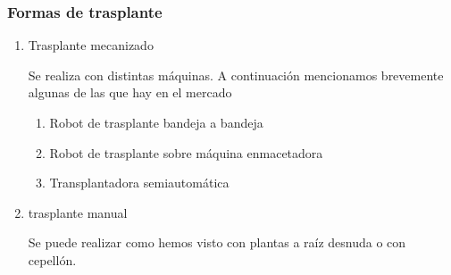 \documentclass[a4paper,12pt,oneside]{article}
\begin{document}
\subsubsection{Formas de trasplante}
\label{sec:orgc807d1e}

\begin{enumerate}
\item Trasplante mecanizado
\label{sec:org377e34f}

Se realiza con distintas máquinas. A continuación mencionamos brevemente algunas
de las que hay en el mercado

\begin{enumerate}
\item Robot de trasplante bandeja a bandeja
\label{sec:org8d304e7}

\item Robot de trasplante sobre máquina enmacetadora
\label{sec:orgeffdd15}

\item Transplantadora semiautomática
\label{sec:org8f3f5a4}
\end{enumerate}

\item trasplante manual
\label{sec:org92d6104}

Se puede realizar como hemos visto con plantas a raíz desnuda o con cepellón.
\end{enumerate}
\end{document}
